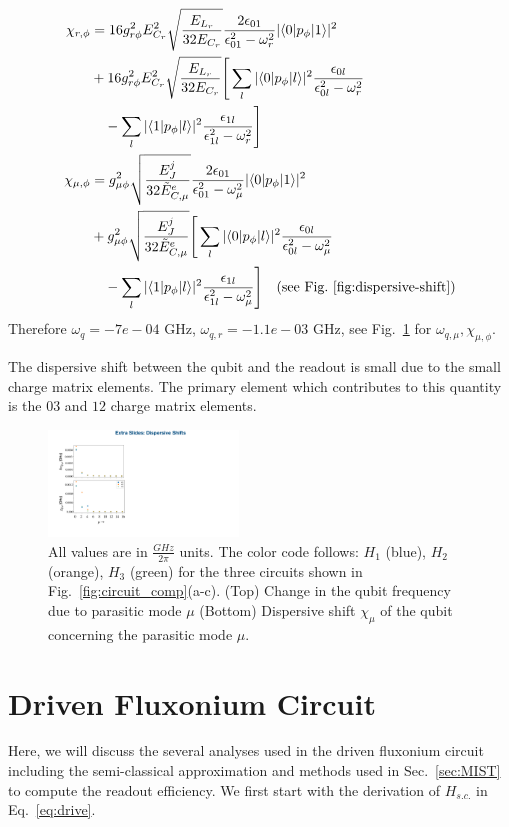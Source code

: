 \documentclass[%
reprint,
superscriptaddress,
 amsmath,amssymb,
 aps,
 prx,
longbibliography,
floatfix,
]{revtex4-2}
\newcommand{\singh}[1]{{\color{orange}{{}#1}}}%
\begin{document}
{\begin{align}
\chi_{r,\phi}&=16g_{r\phi}^2E_{C_r}^2\sqrt{\frac{E_{L_r}}{32E_{C_r}}}\frac{2\epsilon_{01}}{\epsilon_{01}^2-\omega_r^2}|\langle 0|p_\phi|1 \rangle|^2\nonumber\\
   &+16g_{r\phi}^2E_{C_r}^2\sqrt{\frac{E_{L_r}}{32E_{C_r}}}\Bigg[\sum_l|\langle 0|p_\phi|l \rangle|^2\frac{\epsilon_{0l}}{\epsilon_{0l}^2-\omega_r^2}\nonumber\\&\quad-\sum_l|\langle 1|p_\phi|l \rangle|^2\frac{\epsilon_{1l}}{\epsilon_{1l}^2-\omega_r^2}\Bigg] \\
   \chi_{\mu,\phi}&=g_{\mu\phi}^2\sqrt{\frac{E_J^j}{32\tilde{E}_{C,\mu}^e}}\frac{2\epsilon_{01}}{\epsilon_{01}^2-\omega_\mu^2}|\langle 0|p_\phi|1 \rangle|^2\nonumber\\
   &+g_{\mu\phi}^2\sqrt{\frac{E_J^j}{32\tilde{E}_{C,\mu}^e}}\Bigg[\sum_l|\langle 0|p_\phi|l \rangle|^2\frac{\epsilon_{0l}}{\epsilon_{0l}^2-\omega_\mu^2}\nonumber\\&\quad-\sum_l|\langle 1|p_\phi|l \rangle|^2\frac{\epsilon_{1l}}{\epsilon_{1l}^2-\omega_\mu^2}\Bigg]
   \quad\text{(see Fig.~\ref{fig:dispersive-shift})}
\end{align}
}
Therefore $\omega_q=-7e-04$ GHz, $\omega_{q,r}=-1.1e-03$ GHz, see Fig.~\ref{fig:dispersive-shift} for $\omega_{q,\mu},\chi_{\mu,\phi}$.
   
The dispersive shift between the qubit and the readout is small due to the small charge matrix elements. The primary element which contributes to this quantity is the $03$ and $12$ charge matrix elements. 
\begin{figure}[htb]
    \centering
    \includegraphics[width=0.45\textwidth]{Figures/dispersive-shift.pdf}
    \caption{All values are in $\frac{GHz}{2\pi}$ units. The color code follows: $H_1$ (blue), $H_2$ (orange), $H_3$ (green) for the three circuits shown in Fig.~\ref{fig:circuit_comp}(a-c). (Top) Change in the qubit frequency due to parasitic mode $\mu$ (Bottom) Dispersive shift $\chi_\mu$ of the qubit concerning the parasitic mode $\mu$.}
    \label{fig:dispersive-shift}
\end{figure}
\section{Driven Fluxonium Circuit}\label{app:MIST}
Here, we will discuss the several analyses used in the driven fluxonium circuit including the semi-classical approximation and methods used in Sec.~\ref{sec:MIST} to compute the readout efficiency. We first start with the derivation of $H_{s.c.}$ in Eq.~\ref{eq:drive}. \singh{Derivation goes here}
\end{document}
